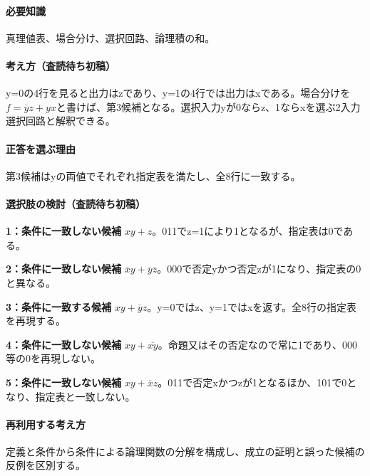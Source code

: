 \paragraph{必要知識} 真理値表、場合分け、選択回路、論理積の和。

\paragraph{考え方（査読待ち初稿）} y=\allowbreak{}0の4行を見ると出力はzであり、y=\allowbreak{}1の4行では出力はxである。場合分けを\(f=\overline y z+yx\)と書けば、第3候補となる。選択入力yが0ならz、1ならxを選ぶ2入力選択回路と解釈できる。

\paragraph{正答を選ぶ理由} 第3候補はyの両値でそれぞれ指定表を満たし、全8行に一致する。

\paragraph{選択肢の検討（査読待ち初稿）}\mbox{}\par

\noindent\textbf{1：条件に一致しない候補} \(xy+z\)。011でz=\allowbreak{}1により1となるが、指定表は0である。\par

\noindent\textbf{2：条件に一致しない候補} \(\overline x y+\overline y\overline z\)。000で否定yかつ否定zが1になり、指定表の0と異なる。\par

\noindent\textbf{3：条件に一致する候補} \(xy+\overline y z\)。y=\allowbreak{}0ではz、y=\allowbreak{}1ではxを返す。全8行の指定表を再現する。\par

\noindent\textbf{4：条件に一致しない候補} \(xy+\overline{xy}\)。命題又はその否定なので常に1であり、000等の0を再現しない。\par

\noindent\textbf{5：条件に一致しない候補} \(xy+\overline x z\)。011で否定xかつzが1となるほか、101で0となり、指定表と一致しない。\par

\paragraph{再利用する考え方} 定義と条件から条件による論理関数の分解を構成し、成立の証明と誤った候補の反例を区別する。


